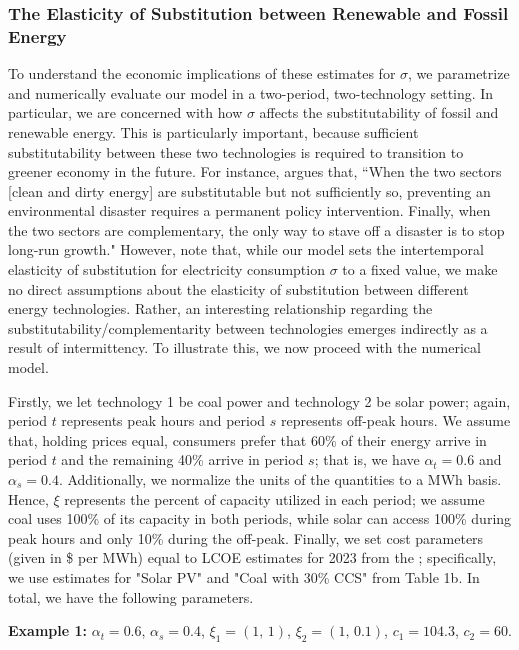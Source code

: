 \documentclass[11pt,a4paper]{extarticle}
\begin{document}
\subsubsection{The Elasticity of Substitution between Renewable and Fossil Energy}


To understand the economic implications of these estimates for $\sigma$, we parametrize and numerically evaluate our model in a two-period, two-technology setting. In particular, we are concerned with how $\sigma$ affects the substitutability of fossil and renewable energy. This is particularly important, because sufficient substitutability between these two technologies is required to transition to greener economy in the future. For instance, \citet{Ace2012} argues that, ``When the two
sectors [clean and dirty energy] are substitutable but not sufficiently so, preventing an environmental disaster requires a permanent policy intervention. Finally, when the two sectors are complementary, the only way to stave off a disaster is to stop long-run growth." However, note that, while our model sets the intertemporal elasticity of substitution for  electricity consumption $\sigma$ to a fixed value, we make no direct assumptions about the elasticity of substitution between different energy technologies. Rather, an interesting relationship regarding the substitutability/complementarity between technologies emerges indirectly as a result of intermittency. To illustrate this, we now proceed with the numerical model.

Firstly, we let technology 1 be coal power and technology 2 be solar power; again, period $t$ represents peak hours and period $s$ represents off-peak hours. We assume that, holding prices equal, consumers prefer that 60\% of their energy arrive in period $t$ and the remaining 40\% arrive in period $s$; that is, we have $\alpha_t = 0.6$ and $\alpha_s = 0.4$. Additionally, we normalize the units of the quantities to a MWh basis. Hence, $\xi$ represents the percent of capacity utilized in each period; we assume coal uses 100\% of its capacity in both periods, while solar can access 100\% during peak hours and only 10\% during the off-peak. Finally, we set cost parameters (given in  \$ per MWh)  equal to LCOE estimates for 2023 from the \citet{EIALCOE}; specifically, we use estimates for "Solar PV" and "Coal with 30\% CCS" from Table 1b. In total, we have the following parameters. 

\begin{center}
	\noindent \textbf{Example  1:} $\alpha_t = 0.6$, $\alpha_s = 0.4$, $\xi_1 = (1, \, 1)$, $\xi_2 = (1, \, 0.1)$, $c_1 = 104.3$, $c_2 = 60$. 
\end{center}
\end{document}
